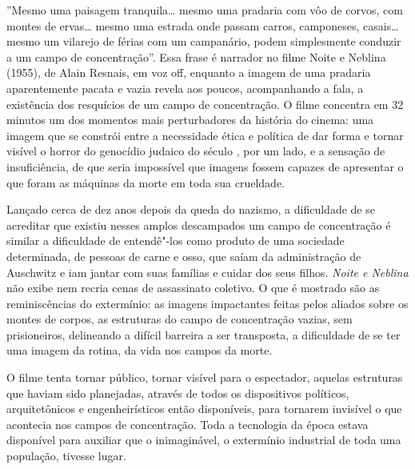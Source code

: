 \asterisc

''Mesmo uma paisagem tranquila\ldots{} mesmo uma pradaria com vôo de corvos,
com montes de ervas\ldots{} mesmo uma estrada onde passam carros, camponeses,
casais\ldots{} mesmo um vilarejo de férias com um campanário, podem
simplesmente conduzir a um campo de concentração''. Essa frase é
narrador no filme Noite e Neblina (1955), de Alain Resnais, em voz off,
enquanto a imagem de uma pradaria aparentemente pacata e vazia revela
aos poucos, acompanhando a fala, a existência dos resquícios de um campo
de concentração. O filme concentra em 32 minutos um dos momentos mais
perturbadores da história do cinema: uma imagem que se constrói entre a
necessidade ética e política de dar forma e tornar visível o horror do
genocídio judaico do século , por um lado, e a sensação de
insuficiência, de que seria impossível que imagens fossem capazes de
apresentar o que foram as máquinas da morte em toda sua crueldade.

Lançado cerca de dez anos depois da queda do nazismo, a dificuldade de
se acreditar que existiu nesses amplos descampados um campo de
concentração é similar a dificuldade de entendê"-los como produto de uma
sociedade determinada, de pessoas de carne e osso, que saíam da
administração de Auschwitz e iam jantar com suas famílias e cuidar dos
seus filhos. \emph{Noite e Neblina} não exibe nem recria cenas de
assassinato coletivo. O que é mostrado são as reminiscências do
extermínio: as imagens impactantes feitas pelos aliados sobre os montes
de corpos, as estruturas do campo de concentração vazias, sem
prisioneiros, delineando a difícil barreira a ser transposta, a
dificuldade de se ter uma imagem da rotina, da vida nos campos da morte.

O filme tenta tornar público, tornar visível para o espectador, aquelas
estruturas que haviam sido planejadas, através de todos os dispositivos
políticos, arquitetônicos e engenheirísticos então disponíveis, para
tornarem invisível o que acontecia nos campos de concentração. Toda a
tecnologia da época estava disponível para auxiliar que o inimaginável,
o extermínio industrial de toda uma população, tivesse lugar.

